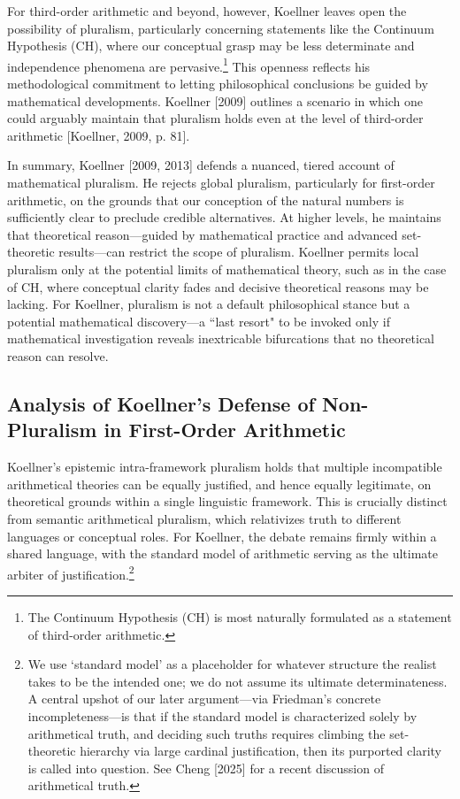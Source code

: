 \documentclass[a4paper,12pt]{amsart}
\theoremstyle{definition}
\numberwithin{equation}{section}
\begin{document}
For third-order arithmetic and beyond, however, Koellner leaves open the possibility of pluralism, particularly concerning statements like the Continuum Hypothesis ({\sf CH}), where our conceptual grasp may be less determinate and independence phenomena are pervasive.\footnote{The Continuum Hypothesis ({\sf CH}) is most naturally formulated as a statement of third-order arithmetic.} This openness reflects his methodological commitment to letting philosophical conclusions be guided by mathematical developments.  Koellner [2009] outlines a scenario in which one could arguably maintain that pluralism holds even at the level of third-order arithmetic [Koellner, 2009, p. 81]. 


  
  
In summary, Koellner [2009, 2013] defends a nuanced, tiered account of mathematical pluralism. He rejects global pluralism, particularly for first-order arithmetic, on the grounds that our conception of the natural numbers is sufficiently clear to preclude credible alternatives. At higher levels, he maintains that theoretical reason—guided by mathematical practice and advanced set-theoretic results—can restrict the scope of pluralism. Koellner permits local pluralism only at the potential limits of mathematical theory, such as in the case of {\sf CH}, where conceptual clarity fades and decisive theoretical reasons may be lacking. For Koellner, pluralism is not a default philosophical stance but a potential mathematical discovery—a ``last resort" to be invoked only if mathematical investigation reveals inextricable bifurcations that no theoretical reason can resolve.

\subsection{Analysis of Koellner's Defense of Non-Pluralism in First-Order Arithmetic}\label{section2.2}

      
Koellner's epistemic intra-framework pluralism holds that multiple incompatible arithmetical theories can be equally justified, and hence equally legitimate, on theoretical grounds within a single linguistic framework. This is crucially distinct from semantic arithmetical pluralism, which relativizes truth to different languages or conceptual roles. For Koellner, the debate remains firmly within a shared language, with the standard model of arithmetic serving as the ultimate arbiter of justification.\footnote{We use `standard model' as a placeholder for whatever structure the realist takes to be the intended one; we do not assume its ultimate determinateness. A central upshot of our later argument---via Friedman's concrete incompleteness---is that if the standard model is characterized solely by arithmetical truth, and deciding such truths requires climbing the set-theoretic hierarchy via large cardinal justification, then its purported clarity is called into question. See Cheng [2025] for a recent discussion of arithmetical truth.}
 
\end{document}
